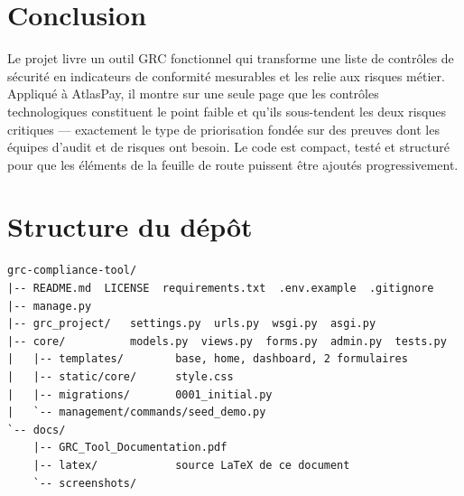 \documentclass[11pt,a4paper]{article}
\begin{document}
\section{Conclusion}
Le projet livre un outil GRC fonctionnel qui transforme une liste de contrôles de sécurité en indicateurs de conformité mesurables et les relie aux risques métier. Appliqué à AtlasPay, il montre sur une seule page que les contrôles technologiques constituent le point faible et qu'ils sous-tendent les deux risques critiques --- exactement le type de priorisation fondée sur des preuves dont les équipes d'audit et de risques ont besoin. Le code est compact, testé et structuré pour que les éléments de la feuille de route puissent être ajoutés progressivement.

\clearpage
\appendix
\section{Structure du dépôt}
\begin{lstlisting}
grc-compliance-tool/
|-- README.md  LICENSE  requirements.txt  .env.example  .gitignore
|-- manage.py
|-- grc_project/   settings.py  urls.py  wsgi.py  asgi.py
|-- core/          models.py  views.py  forms.py  admin.py  tests.py
|   |-- templates/        base, home, dashboard, 2 formulaires
|   |-- static/core/      style.css
|   |-- migrations/       0001_initial.py
|   `-- management/commands/seed_demo.py
`-- docs/
    |-- GRC_Tool_Documentation.pdf
    |-- latex/            source LaTeX de ce document
    `-- screenshots/
\end{lstlisting}
\end{document}
